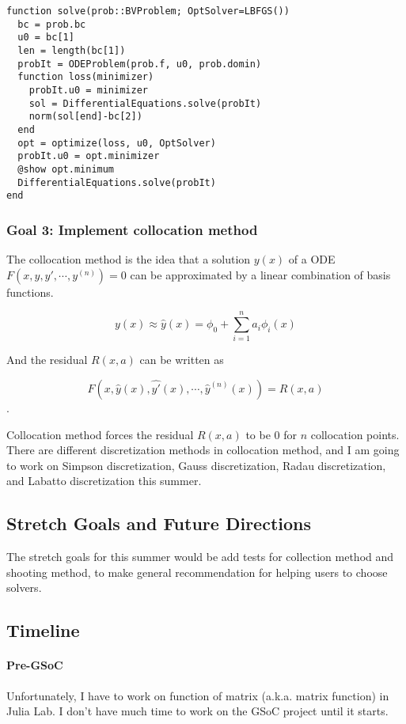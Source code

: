 \documentclass[a4paper,12pt,onecolumn]{article}
\begin{document}
\begin{lstlisting}[mathescape=true]
function solve(prob::BVProblem; OptSolver=LBFGS())
  bc = prob.bc
  u0 = bc[1]
  len = length(bc[1])
  probIt = ODEProblem(prob.f, u0, prob.domin)
  function loss(minimizer)
    probIt.u0 = minimizer
    sol = DifferentialEquations.solve(probIt)
    norm(sol[end]-bc[2])
  end
  opt = optimize(loss, u0, OptSolver)
  probIt.u0 = opt.minimizer
  @show opt.minimum
  DifferentialEquations.solve(probIt)
end
\end{lstlisting}

\subsubsection{Goal 3: Implement collocation method}
The collocation method is the idea that a solution $y(x)$ of a ODE $F(x, y, y', \cdots, y^{(n)}) = 0$
can be approximated by a linear combination of basis functions.

\[y(x) \approx \hat{y}(x) = \phi_0 + \sum_{i=1}^na_i\phi_i(x)\]

And the residual $R(x,a)$ can be written as

\[F(x, \hat{y}(x), \hat{y'}(x), \cdots, \hat{y}^{(n)}(x)) = R(x,a)\].

Collocation method forces the residual $R(x,a)$ to be $0$ for $n$ collocation points.
There are different discretization methods in collocation method, and I am going to work on
Simpson discretization, Gauss discretization, Radau discretization, and Labatto
discretization this summer.

\subsection{Stretch Goals and Future Directions}
The stretch goals for this summer would be add tests for collection method and shooting method, to
make general recommendation for helping users to choose solvers.

\subsection{Timeline}
\paragraph{Pre-GSoC} %
\label{par:pre_gsoc}
Unfortunately, I have to work on function of matrix (a.k.a. matrix function) in Julia Lab.
I don't have much time to work on the GSoC project until it starts.
\end{document}
